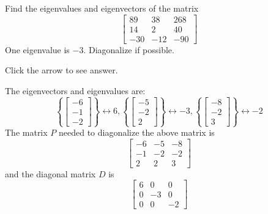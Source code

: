 \documentclass{ximera}
\begin{document}
\begin{problem}\label{prb:8.22} Find the eigenvalues and eigenvectors of the matrix
\begin{equation*}
\left[
\begin{array}{rrr}
89 & 38 & 268 \\
14 & 2 & 40 \\
-30 & -12 & -90
\end{array}
\right]
\end{equation*}
One eigenvalue is $-3.$ Diagonalize if possible.

Click the arrow to see answer.
\begin{expandable}
The eigenvectors and eigenvalues are:
\[
\left\{ \left[
\begin{array}{c}
-6 \\
-1 \\
-2
\end{array}
\right] \right\} \leftrightarrow 6, \left\{ \left[
\begin{array}{c}
-5 \\
-2 \\
2
\end{array}
\right] \right\} \leftrightarrow -3, \left\{ \left[
\begin{array}{c}
-8 \\
-2 \\
3
\end{array}
\right] \right\} \leftrightarrow -2
\]
The matrix $P$ needed to diagonalize the above matrix is
\[
\left[
\begin{array}{rrr}
-6 & -5 & -8 \\
-1 & -2 & -2 \\
2 & 2 & 3
\end{array}
\right]
\]
and the diagonal matrix $D$ is
\[
\left[
\begin{array}{rrr}
6 & 0 & 0  \\
0 & -3 & 0 \\
0 & 0 & -2
\end{array}
\right]
\]
\end{expandable}
\end{problem}
\end{document}
